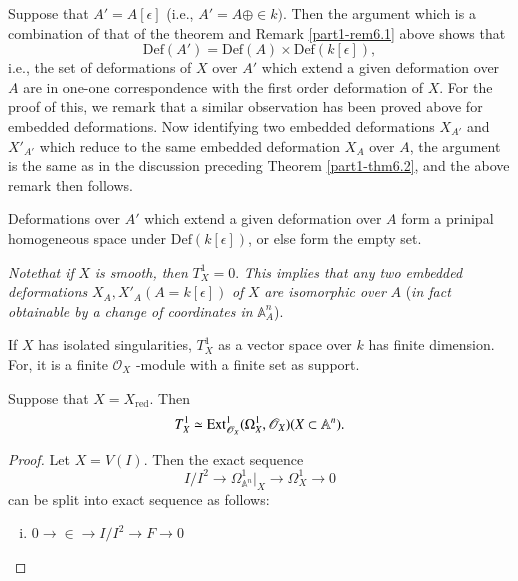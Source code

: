 {\begin{remark}\label{part1-rem6.4}%
Suppose that $A'=A[\epsilon]$ (i.e., $A'=A\oplus \in k)$. Then the
argument which is a combination of that of the theorem and
Remark \ref{part1-rem6.1} above shows that 
$$
\text{Def}(A')=\text{Def}(A)\times \text{Def}(k[\epsilon]),
$$
i.e., the set of deformations of $X$ over $A'$ which extend a given
deformation over $A$ are in one-one correspondence with the first
order deformation of $X$. For the proof of this, we remark that a
similar observation has been proved above for embedded
deformations. Now identifying two embedded deformations $X_{A'}$ and
$X'_{A'}$ which reduce to the same embedded deformation $X_A$ over
$A$, the argument is the same as in the discussion preceding
Theorem \ref{part1-thm6.2}, and the above remark then follows. 
\end{remark}

\begin{remark}\label{part1-rem6.5}%
Deformations over $A'$ which extend a given deformation over $A$ form
a prinipal homogeneous space under $\text{Def}(k[\epsilon])$, or else
form the empty set. 
\end{remark}

\begin{remark}\label{part1-rem6.6}%
{\em Note\pageoriginale that if} $X$ {\em is smooth, then}
$T^{1}_X=0$. {\em This implies that any two embedded deformations}
$X_A, X'_A(A=k[\epsilon])$ {\em of} $X$ {\em are isomorphic over} $A$
({\em in fact obtainable by a change of coordinates in}
$\mathbb{A}_A^{n}$). 
\end{remark}

\begin{remark}\label{part1-rem6.7}%
If $X$ has isolated singularities, $T_X^{1}$ as a vector space over
$k$ has finite dimension. For, it is a finite $\mathscr{O}_X$ -module
with a finite set as support. 
\end{remark}

\begin{proposition}\label{part1-prop6.1}%
Suppose that $X=X_{\text{red}}$. Then
$$
T_{X}^{1}\simeq \operatorname{Ext}^{1}_{\mathscr{O}_{X}}(\Omega^{1}_{X}, \mathscr{O}_X)(X\subset \mathbb{A}^{n}).
$$
\end{proposition}

\begin{proof}
Let $X=V(I)$. Then the exact sequence
$$
I/I^{2}\to \Omega^{1}_{\mathbb{A}^{n}}\big |_X \to \Omega_{X}^{1}\to 0
$$
can be split into exact sequence as follows:
\begin{enumerate}[(i)]
\item $0\to \in  \to I/I^{2}\to F \to 0$


\end{enumerate}
\end{proof}}
